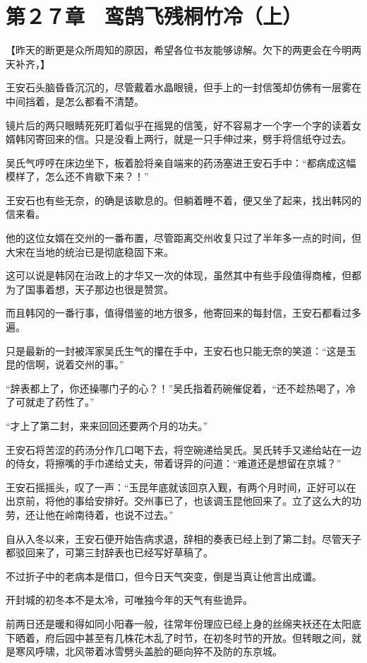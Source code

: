 \section{第２７章　鸾鹄飞残桐竹冷（上）}

【昨天的断更是众所周知的原因，希望各位书友能够谅解。欠下的两更会在今明两天补齐，】

王安石头脑昏昏沉沉的，尽管戴着水晶眼镜，但手上的一封信笺却仿佛有一层雾在中间挡着，是怎么都看不清楚。

镜片后的两只眼睛死死盯着似乎在摇晃的信笺，好不容易才一个字一个字的读着女婿韩冈寄回来的信。只是没看上两行，就是一只手伸过来，劈手将信纸夺过去。

吴氏气哼哼在床边坐下，板着脸将亲自端来的药汤塞进王安石手中：“都病成这幅模样了，怎么还不肯歇下来？！”

王安石也有些无奈，的确是该歇息的。但躺着睡不着，便又坐了起来，找出韩冈的信来看。

他的这位女婿在交州的一番布置，尽管距离交州收复只过了半年多一点的时间，但大宋在当地的统治已是彻底稳固下来。

这可以说是韩冈在治政上的才华又一次的体现，虽然其中有些手段值得商榷，但都为了国事着想，天子那边也很是赞赏。

而且韩冈的一番行事，值得借鉴的地方很多，他寄回来的每封信，王安石都看过多遍。

只是最新的一封被浑家吴氏生气的攥在手中，王安石也只能无奈的笑道：“这是玉昆的信啊，说着交州的事。”

“辞表都上了，你还操哪门子的心？！”吴氏指着药碗催促着，“还不趁热喝了，冷了可就走了药性了。”

“才上了第二封，来来回回还要两个月的功夫。”

王安石将苦涩的药汤分作几口喝下去，将空碗递给吴氏。吴氏转手又递给站在一边的侍女，将擦嘴的手巾递给丈夫，带着讶异的问道：“难道还是想留在京城？”

王安石摇摇头，叹了一声：“玉昆年底就该回京入觐，有两个月时间，正好可以在出京前，将他的事给安排好。交州事已了，也该调玉昆他回来了。立了这么大的功劳，还让他在岭南待着，也说不过去。”

自从入冬以来，王安石便开始告病求退，辞相的奏表已经上到了第二封。尽管天子都驳回来了，可第三封辞表也已经写好草稿了。

不过折子中的老病本是借口，但今日天气突变，倒是当真让他言出成谶。

开封城的初冬本不是太冷，可唯独今年的天气有些诡异。

前两日还是暖和得如同小阳春一般，往常年份理应已经上身的丝绵夹袄还在太阳底下晒着，府后园中甚至有几株花木乱了时节，在初冬时节的开放。但转眼之间，就是寒风呼啸，北风带着冰雪劈头盖脸的砸向猝不及防的东京城。

